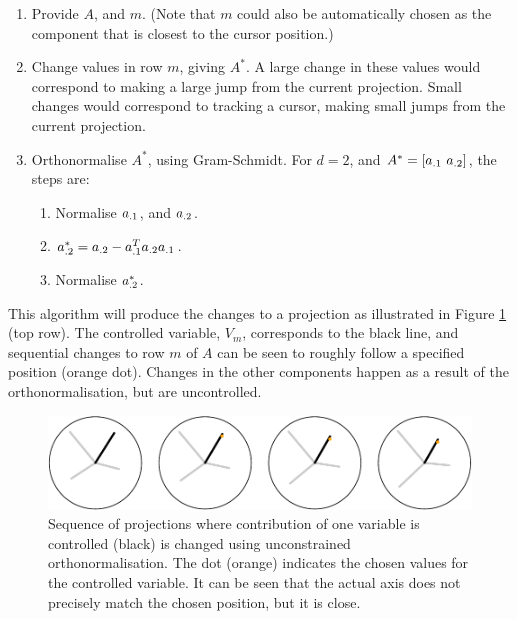 \documentclass[]{interact}
\theoremstyle{plain}%
\theoremstyle{definition}
\theoremstyle{remark}
\providecommand{\tightlist}{%
  \setlength{\itemsep}{0pt}\setlength{\parskip}{0pt}}
\def\tightlist{}
\begin{document}
\begin{enumerate}
\def\labelenumi{\arabic{enumi}.}
\item
  Provide \(A\), and \(m\). (Note that \(m\) could also be automatically
  chosen as the component that is closest to the cursor position.)
\item
  Change values in row \(m\), giving \(A^*\). A large change in these
  values would correspond to making a large jump from the current
  projection. Small changes would correspond to tracking a cursor,
  making small jumps from the current projection.
\item
  Orthonormalise \(A^*\), using Gram-Schmidt. For \(d=2\), and
  \(A^* = \left[ {\boldmath a}_{.1}~{\boldmath a}_{.2}\right]\), the
  steps are:

  \begin{enumerate}
  \def\labelenumii{\roman{enumii}.}
  \tightlist
  \item
    Normalise \({\boldmath a}_{.1}\), and \({\boldmath a}_{.2}\).
  \item
    \({\boldmath a}^*_{.2} = {\boldmath a}_{.2} - {\boldmath a}_{.1}^T{\boldmath a}_{.2}{\boldmath a}_{.1}\).
  \item
    Normalise \({\boldmath a}^*_{.2}\).
  \end{enumerate}
\end{enumerate}

This algorithm will produce the changes to a projection as illustrated
in Figure \ref{fig:manualsequence} (top row). The controlled variable,
\(V_m\), corresponds to the black line, and sequential changes to row
\(m\) of \(A\) can be seen to roughly follow a specified position
(orange dot). Changes in the other components happen as a result of the
orthonormalisation, but are uncontrolled.

\begin{figure}
\includegraphics[width=1\linewidth]{paper_files/figure-latex/manualsequence-1} \caption{Sequence of projections where contribution of one variable is controlled (black) is changed using unconstrained orthonormalisation. The dot (orange) indicates the chosen values for the controlled variable. It can be seen that the actual axis does not precisely match the chosen position, but it is close.}\label{fig:manualsequence}
\end{figure}
\end{document}
